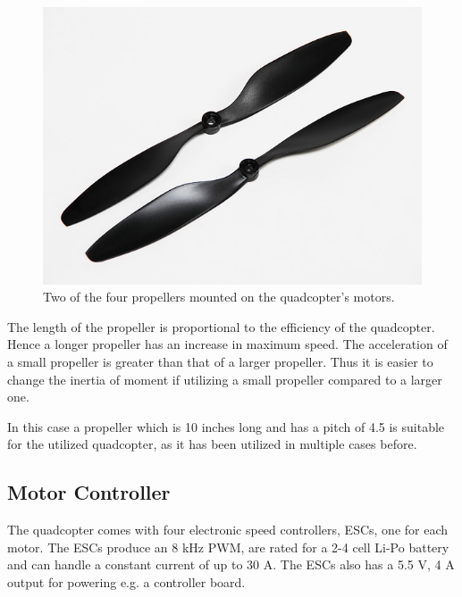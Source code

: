 \begin{figure}[H]
	\centering
	\includegraphics[scale=0.4]{figures/propeller.png}
	\caption{Two of the four propellers mounted on the quadcopter's motors.}
	\label{fig:Propeller}
\end{figure}

The length of the propeller is proportional to the efficiency of the quadcopter. Hence a longer propeller has an increase in maximum speed. The acceleration of a small propeller is greater than that of a larger propeller. Thus it is easier to change the inertia of moment if utilizing a small propeller compared to a larger one.  

In this case a propeller which is 10 inches long and has a pitch of 4.5 is suitable for the utilized quadcopter, as it has been utilized in multiple cases before. 



 
\subsection{Motor Controller}
The quadcopter comes with four electronic speed controllers, ESCs, one for each motor. The ESCs produce an 8 kHz PWM, are rated for a 2-4 cell Li-Po battery and can handle a constant current of up to 30 A. The ESCs also has a 5.5 V, 4 A output for powering e.g. a controller board.\cite{HKing}

